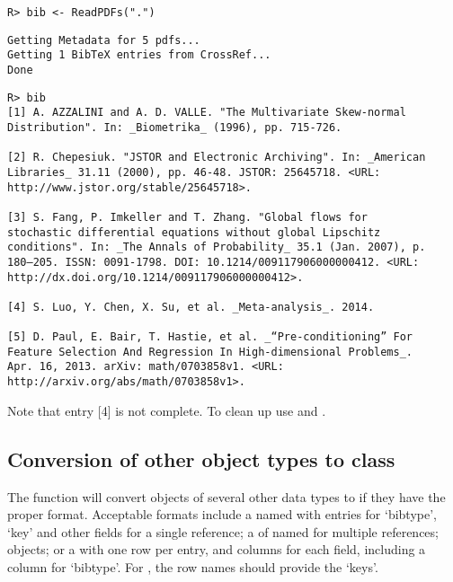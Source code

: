 \documentclass[article]{jss}\usepackage[]{graphicx}\usepackage[]{color}
\makeatletter
\newenvironment{kframe}{%
 \def\at@end@of@kframe{}%
 \ifinner\ifhmode%
  \def\at@end@of@kframe{\end{minipage}}%
  \begin{minipage}{\columnwidth}%
 \fi\fi%
 \def\FrameCommand##1{\hskip\@totalleftmargin \hskip-\fboxsep
 \colorbox{shadecolor}{##1}\hskip-\fboxsep
     \hskip-\linewidth \hskip-\@totalleftmargin \hskip\columnwidth}%
 \MakeFramed {\advance\hsize-\width
   \@totalleftmargin\z@ \linewidth\hsize
   \@setminipage}}%
 {\par\unskip\endMakeFramed%
 \at@end@of@kframe}
\newenvironment{knitrout}{}{} %
\makeatother
\begin{document}
\begin{knitrout}
\color{fgcolor}\begin{kframe}
\begin{verbatim}
R> bib <- ReadPDFs(".")
\end{verbatim}
\begin{lstlisting}[style=output]
Getting Metadata for 5 pdfs...
Getting 1 BibTeX entries from CrossRef...
Done
\end{lstlisting}\begin{verbatim}
R> bib
[1] A. AZZALINI and A. D. VALLE. "The Multivariate Skew-normal
Distribution". In: _Biometrika_ (1996), pp. 715-726.

[2] R. Chepesiuk. "JSTOR and Electronic Archiving". In: _American
Libraries_ 31.11 (2000), pp. 46-48. JSTOR: 25645718. <URL:
http://www.jstor.org/stable/25645718>.

[3] S. Fang, P. Imkeller and T. Zhang. "Global flows for
stochastic differential equations without global Lipschitz
conditions". In: _The Annals of Probability_ 35.1 (Jan. 2007), p.
180–205. ISSN: 0091-1798. DOI: 10.1214/009117906000000412. <URL:
http://dx.doi.org/10.1214/009117906000000412>.

[4] S. Luo, Y. Chen, X. Su, et al. _Meta-analysis_. 2014.

[5] D. Paul, E. Bair, T. Hastie, et al. _“Pre-conditioning” For
Feature Selection And Regression In High-dimensional Problems_.
Apr. 16, 2013. arXiv: math/0703858v1. <URL:
http://arxiv.org/abs/math/0703858v1>.
\end{verbatim}
\end{kframe}
\end{knitrout}

Note that entry [4] is not complete.  To clean up use  and .

\subsection[Conversion of other object types to class BibEntry]{Conversion of other object types to class }
The  function will convert objects of several other data types to  if they have the proper format.  Acceptable formats include a named  with entries for `bibtype', `key' and other fields for a single reference; a  of named  for multiple references;  objects; or a  with one row per entry, and columns for each field, including a column for `bibtype'.  For , the row names should provide the `keys'.
\end{document}
